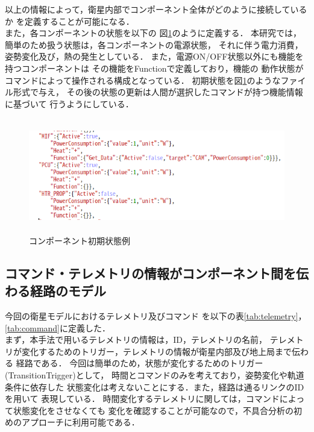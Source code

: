 \documentclass[11pt]{jsreport}
\begin{document}
以上の情報によって，衛星内部でコンポーネント全体がどのように接続しているか
を定義することが可能になる．\\
また，各コンポーネントの状態を以下の
図\ref{fig:Compo_state}のように定義する．
本研究では，簡単のため扱う状態は，各コンポーネントの電源状態，
それに伴う電力消費，姿勢変化及び，熱の発生としている．
また，電源ON/OFF状態以外にも機能を持つコンポーネントは
その機能をFunctionで定義しており，機能の
動作状態がコマンドによって操作される構成となっている．
初期状態を図\ref{fig:Compo_state}のようなファイル形式で与え，
その後の状態の更新は人間が選択したコマンドが持つ機能情報に基づいて
行うようにしている．
\begin{figure}[H]
   \centering
      \includegraphics[height=5.0cm]{figure/Component_state.png}
      \caption{コンポーネント初期状態例}
      \label{fig:Compo_state}
\end{figure}

\subsection{コマンド・テレメトリの情報がコンポーネント間を伝わる経路のモデル}
今回の衛星モデルにおけるテレメトリ及びコマンド
を以下の表\ref{tab:telemetry}，\ref{tab:command}に定義した．\\
まず，本手法で用いるテレメトリの情報は，ID，テレメトリの名前，
テレメトリが変化するためのトリガー，テレメトリの情報が衛星内部及び地上局まで伝わる
経路である．%
今回は簡単のため，状態が変化するためのトリガー(TransitionTrigger)として，
時間とコマンドのみを考えており，姿勢変化や軌道条件に依存した
状態変化は考えないことにする．また，経路は通るリンクのIDを用いて
表現している．
時間変化するテレメトリに関しては，コマンドによって状態変化をさせなくても
変化を確認することが可能なので，不具合分析の初めのアプローチに利用可能である．
\end{document}
